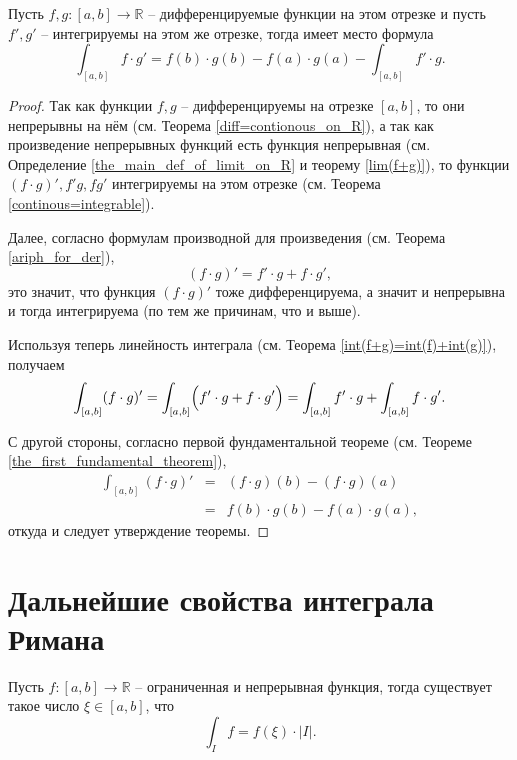 \begin{theorem}
Пусть $f,g:[a,b] \to \mathbb{R}$ -- дифференцируемые функции на этом отрезке и пусть $f',g'$ -- интегрируемы на этом же отрезке, тогда имеет место формула
\[
 \int_{[a,b]} f\cdot g' = f(b)\cdot g(b) - f(a)\cdot g(a) - \int_{[a,b]}f'\cdot g.
\]
\end{theorem}

\begin{proof}
 Так как функции $f,g$ -- дифференцируемы на отрезке $[a,b]$, то они непрерывны на нём (см. Теорема \ref{diff=contionous_on_R}), а так как произведение непрерывных функций есть функция непрерывная (см. Определение \ref{the_main_def_of_limit_on_R} и теорему \ref{lim(f+g)}), то функции $(f\cdot g)',f'g, fg'$ интегрируемы на этом отрезке (см. Теорема \ref{continous=integrable}).

 Далее, согласно формулам производной для произведения (см. Теорема \ref{ariph_for_der}), 
 \[
  (f\cdot g)' = f'\cdot g + f\cdot g',
 \]
 это значит, что функция $(f\cdot g)'$ тоже дифференцируема, а значит и непрерывна и тогда интегрируема (по тем же причинам, что и выше).

 Используя теперь линейность интеграла (см. Теорема \ref{int(f+g)=int(f)+int(g)}), получаем
 \[
  \int_{[a,b]} (f\cdot g)' = \int_{[a,b]} \Bigl( f'\cdot g + f\cdot g' \Bigr) = \int_{[a,b]}  f'\cdot g + \int_{[a,b]} f\cdot g'.
 \]

 С другой стороны, согласно первой фундаментальной теореме (см. Теореме \ref{the_first_fundamental_theorem}),
 \begin{eqnarray*}
 \int_{[a,b]} (f \cdot g)' &=& (f\cdot g)(b) - (f \cdot g)(a)\\
 &=& f(b)\cdot g(b) - f(a) \cdot g(a),    
 \end{eqnarray*}
откуда и следует утверждение теоремы.
\end{proof}


\section{Дальнейшие свойства интеграла Римана}

\begin{theorem}\label{avareg_theorem}
    Пусть $f:[a,b] \to \mathbb{R}$ -- ограниченная и непрерывная функция, тогда существует такое число $\xi \in [a,b]$, что
    \[
     \int_{I} f = f(\xi) \cdot |I|.
    \]
\end{theorem}

